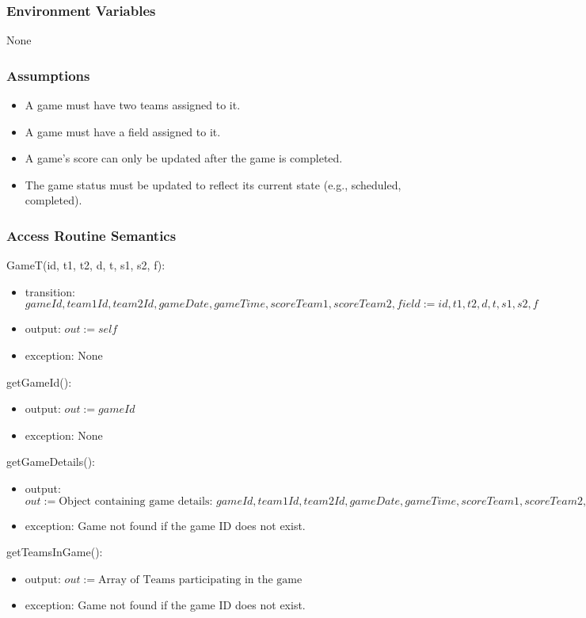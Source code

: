 \documentclass[12pt, titlepage]{article}
\begin{document}
\subsubsection{Environment Variables}
None

\subsubsection{Assumptions}
\begin{itemize}
  \item A game must have two teams assigned to it.
  \item A game must have a field assigned to it.
  \item A game's score can only be updated after the game is completed.
  \item The game status must be updated to reflect its current state (e.g., scheduled, completed).
\end{itemize}

\subsubsection{Access Routine Semantics}

\noindent GameT(id, t1, t2, d, t, s1, s2, f):
\begin{itemize}
  \item transition: $gameId, team1Id, team2Id, gameDate, gameTime, scoreTeam1, scoreTeam2, field := id, t1, t2, d, t, s1, s2, f$
  \item output: $out := self$
  \item exception: None
\end{itemize}

\noindent getGameId():
\begin{itemize}
  \item output: $out := gameId$
  \item exception: None
\end{itemize}

\noindent getGameDetails():
\begin{itemize}
  \item output: $out := \text{Object containing game details: } gameId, team1Id, team2Id, gameDate, gameTime, scoreTeam1, scoreTeam2, status, field$
  \item exception: Game not found if the game ID does not exist.
\end{itemize}

\noindent getTeamsInGame():
\begin{itemize}
  \item output: $out := \text{Array of Teams participating in the game}$
  \item exception: Game not found if the game ID does not exist.
\end{itemize}
\end{document}
